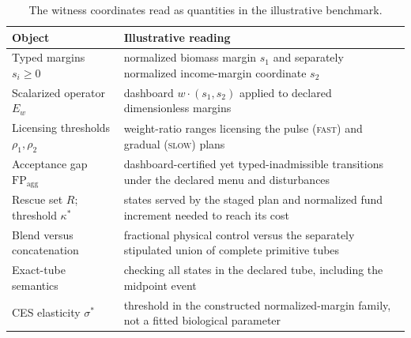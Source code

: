 \documentclass[preprint,11pt,authoryear]{elsarticle}
\theoremstyle{remark}
\newcommand{\FP}{\mathrm{FP}_{\mathrm{agg}}}
\newcommand{\act}[1]{\textsc{#1}}
\begin{document}
\begin{table}[!htbp]
\centering\small
\caption{The witness coordinates read as quantities in the illustrative benchmark.}
\label{tab:fisheries}
\begin{tabularx}{\textwidth}{@{}>{\raggedright\arraybackslash}p{}X@{}}
\toprule
Object & Illustrative reading \\
\midrule
Typed margins $s_i\ge0$ & normalized biomass margin $s_1$ and separately normalized income-margin coordinate $s_2$ \\
Scalarized operator $E_w$ & dashboard $w\cdot(s_1,s_2)$ applied to declared dimensionless margins \\
Licensing thresholds $\rho_1,\rho_2$ & weight-ratio ranges licensing the pulse (\act{fast}) and gradual (\act{slow}) plans \\
Acceptance gap $\FP$ & dashboard-certified yet typed-inadmissible transitions under the declared menu and disturbances \\
Rescue set $R$; threshold $\kappa^*$ & states served by the staged plan and normalized fund increment needed to reach its cost \\
Blend versus concatenation & fractional physical control versus the separately stipulated union of complete primitive tubes \\
Exact-tube semantics & checking all states in the declared tube, including the midpoint event \\
CES elasticity $\sigma^*$ & threshold in the constructed normalized-margin family, not a fitted biological parameter \\
\bottomrule
\end{tabularx}
\end{table}
\end{document}
